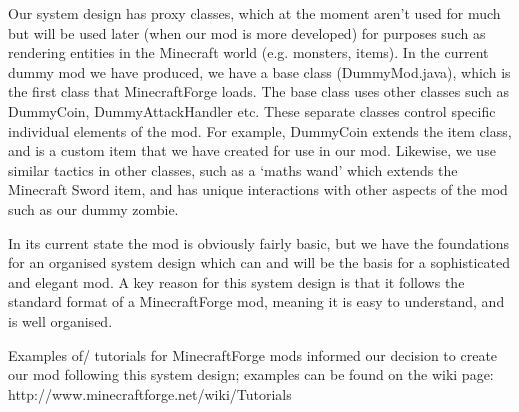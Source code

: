 Our system design has proxy classes, which at the moment aren’t used for much but will be used later (when our mod is more developed) for purposes such as rendering entities in the Minecraft world (e.g. monsters, items). In the current dummy mod we have produced, we have a base class (DummyMod.java), which is the first class that MinecraftForge loads. The base class uses other classes such as DummyCoin, DummyAttackHandler etc. These separate classes control specific individual elements of the mod. For example, DummyCoin extends the item class, and is a custom item that we have created for use in our mod. Likewise, we use similar tactics in other classes, such as a ‘maths wand’ which extends the Minecraft Sword item, and has unique interactions with other aspects of the mod such as our dummy zombie. 

In its current state the mod is obviously fairly basic, but we have the foundations for an organised system design which can and will be the basis for a sophisticated and elegant mod. A key reason for this system design is that it follows the standard format of a MinecraftForge mod, meaning it is easy to understand, and is well organised. 

Examples of/ tutorials for MinecraftForge mods informed our decision to create our mod following this system design; examples can be found on the wiki page: http://www.minecraftforge.net/wiki/Tutorials